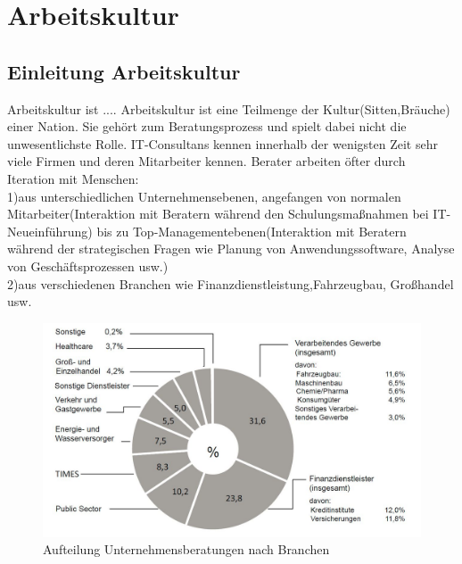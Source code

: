 \section{Arbeitskultur}
	\subsection{Einleitung Arbeitskultur}
Arbeitskultur ist ....
Arbeitskultur ist eine Teilmenge der Kultur(Sitten,Bräuche) einer Nation. Sie gehört zum Beratungsprozess und spielt dabei nicht die unwesentlichste Rolle. IT-Consultans kennen innerhalb der wenigsten Zeit sehr viele Firmen und deren Mitarbeiter kennen. Berater arbeiten öfter durch Iteration mit Menschen:\\
1)aus unterschiedlichen Unternehmensebenen, angefangen von normalen Mitarbeiter(Interaktion mit Beratern während den Schulungsmaßnahmen bei IT-Neueinführung) bis zu Top-Managementebenen(Interaktion mit Beratern während der strategischen Fragen wie Planung von Anwendungssoftware, Analyse von Geschäftsprozessen usw.)\\

2)aus verschiedenen Branchen wie Finanzdienstleistung,Fahrzeugbau, Großhandel usw.
\begin{figure}[htp]
\centering
\includegraphics[width=10 cm]{./images/Auft_U_Beratung}
\caption{Aufteilung Unternehmensberatungen nach Branchen}
\label{fig:AufteilungUnternehmensberatung}
\end{figure}

